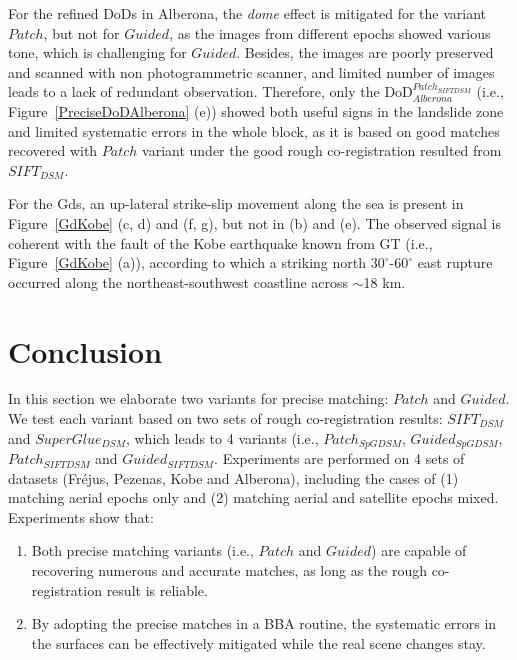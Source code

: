 For the refined \ac{DoD}s in Alberona, the \textit{dome} effect is mitigated for the variant $Patch$, but not for $Guided$, as the images from different epochs showed various tone, which is challenging for $Guided$. Besides, the images are poorly preserved and scanned with non photogrammetric scanner, and limited number of images leads to a lack of redundant observation. Therefore, only the \ac{DoD}$_{Alberona}^{Patch_{SIFTDSM}}$ (i.e., Figure~\ref{PreciseDoDAlberona} (e)) showed both useful signs in the landslide zone and limited systematic errors in the whole block, as it is based on good matches recovered with $Patch$ variant under the good rough co-registration resulted from $SIFT_{DSM}$.\\
\par
For the Gds, an up-lateral strike-slip movement along the sea is present in Figure~\ref{GdKobe} (c, d) and (f, g), but not in (b) and (e). The observed signal is coherent with the fault of the Kobe earthquake known from \ac{GT} (i.e., Figure~\ref{GdKobe} (a)), according to which a striking north $30^{\circ}$-$60^{\circ}$ east rupture occurred along the northeast-southwest coastline across $ \sim $18 km.\\


\section{Conclusion}
In this section we elaborate two variants for precise matching: $Patch$ and $Guided$. 
We test each variant based on two sets of rough co-registration results: $SIFT_{DSM}$ and $SuperGlue_{DSM}$, which leads to 4 variants (i.e.,  $Patch_{SpGDSM}$,  $Guided_{SpGDSM}$,  $Patch_{SIFTDSM}$ and  $Guided_{SIFTDSM}$.
Experiments are performed on 4 sets of datasets (Fr{\'e}jus, Pezenas, Kobe and Alberona), including the cases of (1) matching aerial epochs only and (2) matching aerial and satellite epochs mixed.
Experiments show that:\\
\begin{enumerate}
	\item Both precise matching variants (i.e., $Patch$ and $Guided$) are capable of recovering numerous and accurate matches, as long as the rough co-registration result is reliable.\\
	\item By adopting the precise matches in a \ac{BBA} routine, the systematic errors in the surfaces can be effectively mitigated while the real scene changes stay.
\end{enumerate}


